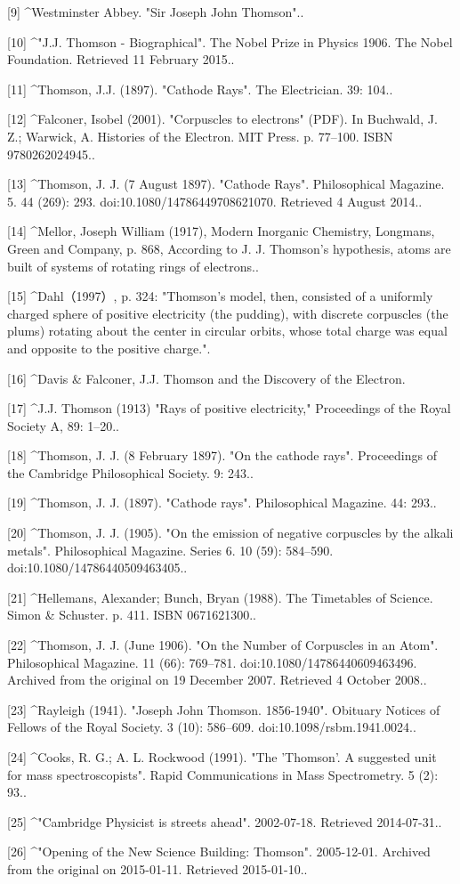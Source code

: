 [9]
^Westminster Abbey. "Sir Joseph John Thomson"..

[10]
^"J.J. Thomson - Biographical". The Nobel Prize in Physics 1906. The Nobel Foundation. Retrieved 11 February 2015..

[11]
^Thomson, J.J. (1897). "Cathode Rays". The Electrician. 39: 104..

[12]
^Falconer, Isobel (2001). "Corpuscles to electrons" (PDF). In Buchwald, J. Z.; Warwick, A. Histories of the Electron. MIT Press. p. 77–100. ISBN 9780262024945..

[13]
^Thomson, J. J. (7 August 1897). "Cathode Rays". Philosophical Magazine. 5. 44 (269): 293. doi:10.1080/14786449708621070. Retrieved 4 August 2014..

[14]
^Mellor, Joseph William (1917), Modern Inorganic Chemistry, Longmans, Green and Company, p. 868, According to J. J. Thomson's hypothesis, atoms are built of systems of rotating rings of electrons..

[15]
^Dahl（1997）, p. 324: "Thomson's model, then, consisted of a uniformly charged sphere of positive electricity (the pudding), with discrete corpuscles (the plums) rotating about the center in circular orbits, whose total charge was equal and opposite to the positive charge.".

[16]
^Davis & Falconer, J.J. Thomson and the Discovery of the Electron.

[17]
^J.J. Thomson (1913) "Rays of positive electricity," Proceedings of the Royal Society A, 89: 1–20..

[18]
^Thomson, J. J. (8 February 1897). "On the cathode rays". Proceedings of the Cambridge Philosophical Society. 9: 243..

[19]
^Thomson, J. J. (1897). "Cathode rays". Philosophical Magazine. 44: 293..

[20]
^Thomson, J. J. (1905). "On the emission of negative corpuscles by the alkali metals". Philosophical Magazine. Series 6. 10 (59): 584–590. doi:10.1080/14786440509463405..

[21]
^Hellemans, Alexander; Bunch, Bryan (1988). The Timetables of Science. Simon & Schuster. p. 411. ISBN 0671621300..

[22]
^Thomson, J. J. (June 1906). "On the Number of Corpuscles in an Atom". Philosophical Magazine. 11 (66): 769–781. doi:10.1080/14786440609463496. Archived from the original on 19 December 2007. Retrieved 4 October 2008..

[23]
^Rayleigh (1941). "Joseph John Thomson. 1856-1940". Obituary Notices of Fellows of the Royal Society. 3 (10): 586–609. doi:10.1098/rsbm.1941.0024..

[24]
^Cooks, R. G.; A. L. Rockwood (1991). "The 'Thomson'. A suggested unit for mass spectroscopists". Rapid Communications in Mass Spectrometry. 5 (2): 93..

[25]
^"Cambridge Physicist is streets ahead". 2002-07-18. Retrieved 2014-07-31..

[26]
^"Opening of the New Science Building: Thomson". 2005-12-01. Archived from the original on 2015-01-11. Retrieved 2015-01-10..